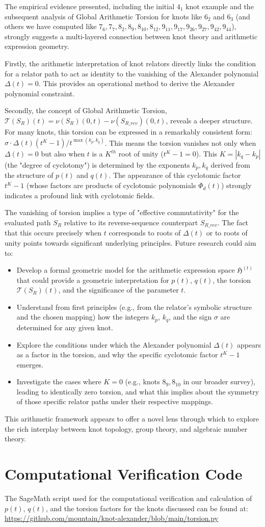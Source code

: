 \documentclass{article}[a4paper,12pt]
\begin{document}
The empirical evidence presented, including the initial $4_1$ knot example and the subsequent analysis of Global Arithmetic Torsion for knots like $6_2$ and $6_3$ (and others we have computed like $7_6, 7_7, 8_2, 8_9, 8_{10}, 8_{12}, 9_{11}, 9_{17}, 9_{26}, 9_{27}, 9_{42}, 9_{44}$), strongly suggests a multi-layered connection between knot theory and arithmetic expression geometry.

Firstly, the arithmetic interpretation of knot relators directly links the condition for a relator path to act as identity to the vanishing of the Alexander polynomial $\Delta(t)=0$. This provides an operational method to derive the Alexander polynomial constraint.

Secondly, the concept of Global Arithmetic Torsion, $\mathcal{T}(S_R)(t) = \nu(S_R)(0,t) - \nu(S_{R\_rev})(0,t)$, reveals a deeper structure. For many knots, this torsion can be expressed in a remarkably consistent form: $\sigma \cdot \Delta(t)(t^K-1) / t^{\max(k_p,k_q)}$. This means the torsion vanishes not only when $\Delta(t)=0$ but also when $t$ is a $K^{th}$ root of unity ($t^K-1=0$). This $K = |k_q-k_p|$ (the "degree of cyclotomy") is determined by the exponents $k_p, k_q$ derived from the structure of $p(t)$ and $q(t)$. The appearance of this cyclotomic factor $t^K-1$ (whose factors are products of cyclotomic polynomials $\Phi_d(t)$) strongly indicates a profound link with cyclotomic fields.

The vanishing of torsion implies a type of "effective commutativity" for the evaluated path $S_R$ relative to its reverse-sequence counterpart $S_{R\_rev}$. The fact that this occurs precisely when $t$ corresponds to roots of $\Delta(t)$ or to roots of unity points towards significant underlying principles. Future research could aim to:
\begin{itemize}
    \item Develop a formal geometric model for the arithmetic expression space $\mathfrak{H}^{(t)}$ that could provide a geometric interpretation for $p(t)$, $q(t)$, the torsion $\mathcal{T}(S_R)(t)$, and the significance of the parameter $t$.
    \item Understand from first principles (e.g., from the relator's symbolic structure and the chosen mapping) how the integers $k_p$, $k_q$, and the sign $\sigma$ are determined for any given knot.
    \item Explore the conditions under which the Alexander polynomial $\Delta(t)$ appears as a factor in the torsion, and why the specific cyclotomic factor $t^K-1$ emerges.
    \item Investigate the cases where $K=0$ (e.g., knots $8_9, 8_{10}$ in our broader survey), leading to identically zero torsion, and what this implies about the symmetry of those specific relator paths under their respective mappings.
\end{itemize}
This arithmetic framework appears to offer a novel lens through which to explore the rich interplay between knot topology, group theory, and algebraic number theory.

\section{Computational Verification Code}

The SageMath script used for the computational verification and calculation of $p(t)$, $q(t)$, and the torsion factors for the knots discussed can be found at:
\url{https://github.com/mountain/knot-alexander/blob/main/torsion.py}
\end{document}
